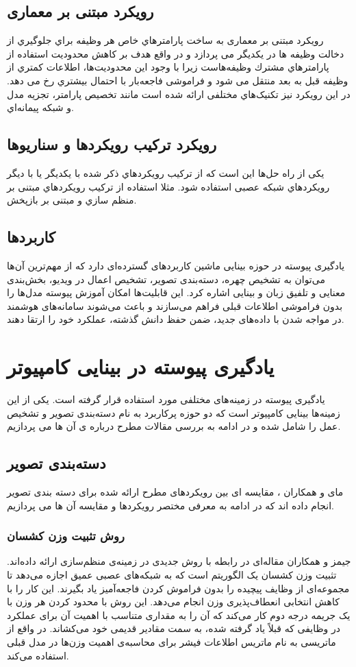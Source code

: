 \subsection{رویکرد مبتنی بر معماری}
رویکرد مبتنی بر معماری 
به ساخت پارامترهاي خاص هر وظیفه براي جلوگیري از دخالت وظیفه ها در یکدیگر می پردازد و در واقع هدف بر کاهش محدودیت استفاده از پارامترهاي مشترك وظیفه‌هاست زیرا با وجود این محدودیت‌ها، اطلاعات کمتري از وظیفه قبل به بعد منتقل می شود و فراموشی فاجعه‌بار با احتمال بیشتري رخ می دهد. در این رویکرد نیز تکنیک‌هاي مختلفی ارائه شده است مانند تخصیص پارامتر، تجزیه مدل و شبکه پیمانه‌اي.
\subsection{رویکرد ترکیب رویکردها و سناریوها}
یکی از راه حل‌ها این است که از ترکیب رویکردهاي ذکر شده با یکدیگر یا با دیگر رویکردهاي شبکه عصبی استفاده شود. مثلا استفاده از ترکیب رویکردهاي مبتنی بر منظم سازي و مبتنی بر بازپخش.

\subsection{کاربردها}
یادگیری پیوسته در حوزه بینایی ماشین کاربردهای گسترده‌ای دارد که از مهم‌ترین آن‌ها می‌توان به تشخیص چهره، دسته‌بندی تصویر، تشخیص اعمال در ویدیو، بخش‌بندی معنایی و تلفیق زبان و بینایی اشاره کرد. این قابلیت‌ها امکان آموزش پیوسته مدل‌ها را بدون فراموشی اطلاعات قبلی فراهم می‌سازند و باعث می‌شوند سامانه‌های هوشمند در مواجه شدن با داده‌های جدید، ضمن حفظ دانش گذشته، عملکرد خود را ارتقا دهند.

\section{یادگیری پیوسته در بینایی کامپیوتر}
یادگیری پیوسته در زمینه‌های مختلفی مورد استفاده قرار گرفته است. یکی از این زمینه‌ها بینایی کامپیوتر است که دو حوزه پرکاربرد به نام دسته‌بندی تصویر و تشخیص عمل را شامل شده و در ادامه به بررسی مقالات مطرح درباره ی آن ها می پردازیم. 
\subsection{دسته‌بندی تصویر}
مای و همکاران 
\cite{2}
، مقایسه ای بین رویکردهای مطرح ارائه شده برای دسته بندی تصویر انجام داده اند که در ادامه به معرفی مختصر رویکردها و مقایسه آن ها می پردازیم.
\subsubsection{روش تثبیت وزن کشسان}
جیمز و همکاران
\cite{7}
مقاله‌ای در رابطه با روش جدیدی در زمینه‌ی منظم‌سازی ارائه داده‌اند. تثبیت وزن کشسان
یک الگوریتم است که به شبکه‌های عصبی عمیق اجازه می‌دهد تا مجموعه‌ای از وظایف پیچیده را بدون فراموش کردن فاجعه‌آمیز یاد بگیرند. این کار را با کاهش انتخابی انعطاف‌پذیری وزن انجام می‌دهد. این روش با محدود کردن هر وزن با یک جریمه درجه دوم کار می‌کند که آن را به مقداری متناسب با اهمیت آن برای عملکرد در وظایفی که قبلاً یاد گرفته شده، به سمت مقادیر قدیمی خود می‌کشاند. در واقع از ماتریسی به نام ماتریس اطلاعات فیشر برای محاسبه‌ی اهمیت وزن‌ها در مدل قبلی استفاده می‌کند.


